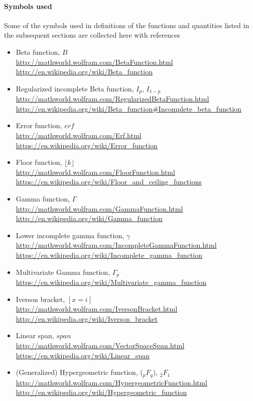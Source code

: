 \paragraph{Symbols used}
Some of the symbols used in definitions of the functions and quantities 
listed in the subsequent sections are collected here with references
\begin{itemize}
\item Beta function, $B$\\
\url{http://mathworld.wolfram.com/BetaFunction.html}\\
\url{http://en.wikipedia.org/wiki/Beta_function}
\item Regularized incomplete Beta function,  $I_p$, $I_{1-p}$\\
\url{http://mathworld.wolfram.com/RegularizedBetaFunction.html}\\
\url{http://en.wikipedia.org/wiki/Beta_function#Incomplete_beta_function}
\item Error function, $erf$\\
\url{http://mathworld.wolfram.com/Erf.html}\\
\url{https://en.wikipedia.org/wiki/Error_function}
\item Floor function, $\lfloor k \rfloor$\\
\url{http://mathworld.wolfram.com/FloorFunction.html}\\
\url{https://en.wikipedia.org/wiki/Floor_and_ceiling_functions}
\item Gamma function, $\Gamma$ \\
\url{http://mathworld.wolfram.com/GammaFunction.html}\\
\url{http://en.wikipedia.org/wiki/Gamma_function}
\item Lower incomplete gamma function, $\gamma$\\
\url{http://mathworld.wolfram.com/IncompleteGammaFunction.html}\\
\url{https://en.wikipedia.org/wiki/Incomplete_gamma_function}
\item Multivariate Gamma function,	$\Gamma_p$\\
\url{https://en.wikipedia.org/wiki/Multivariate_gamma_function}
\item Iverson bracket, $[x=i]$\\ 
\url{http://mathworld.wolfram.com/IversonBracket.html}\\
\url{http://en.wikipedia.org/wiki/Iverson_bracket}
\item Linear span, $span$\\
\url{http://mathworld.wolfram.com/VectorSpaceSpan.html}\\
\url{https://en.wikipedia.org/wiki/Linear_span}
\item (Generalized) Hypergeometric function, ($_pF_q$), $_2F_1$\\
\url{http://mathworld.wolfram.com/HypergeometricFunction.html}\\
\url{http://en.wikipedia.org/wiki/Hypergeometric_function}
\end{itemize}



